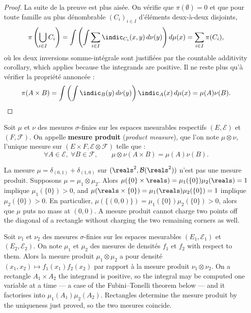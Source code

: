 \begin{proof}
  La suite de la preuve est plus aisée. On vérifie que $\pi(\emptyset) = 0$ et que
  pour toute famille au plus dénombrable $(C_{i})_{i \in I}$ d'éléments deux-à-deux
  disjoints,
  \[
    \pi \left( \bigcup_{i \in I} C_{i} \right)
    = \int \left( \int \sum_{i \in I} \indic_{C_{i}}(x,y) \, d\nu(y) \right) d\mu(x)
    = \sum_{i \in I} \pi(C_{i}) ,
  \]
  où les deux inversions somme-intégrale sont justifiées par the countable
  additivity corollary, which applies because the integrands are positive. Il ne
  reste plus qu'à vérifier la propriété annoncée :
  \[
    \pi(A \times B)
    = \int \left( \int \indic_{B}(y) \, d\nu(y) \right) \indic_{A}(x) \, d\mu(x)
    = \mu(A) \nu(B) . \qedhere
  \]
\end{proof}

\begin{definition}
  Soit $\mu$ et $\nu$ des mesures $\sigma$-finies sur les espaces mesurables
  respectifs $(E,\mathcal{E})$ et $(F,\mathcal{F})$. On appelle \textbf{mesure
  produit} (\textit{product measure}), que l'on note $\mu \otimes \nu$, l'unique
  mesure sur $(E \times F, \mathcal{E} \otimes \mathcal{F})$ telle que :
  \[
    \forall A \in \mathcal{E}, \; \forall B \in \mathcal{F}, \qquad
    \mu \otimes \nu(A \times B) = \mu(A) \nu(B) .
  \]
\end{definition}

\begin{example}
  La mesure $\mu = \delta_{(0,1)} + \delta_{(1,0)}$ sur
  $(\reals^{2},\mathcal{B}(\reals^{2}))$ n'est pas une mesure produit. Supposons
  $\mu = \mu_{1} \otimes \mu_{2}$. Alors $\mu(\{0\} \times \reals) = \mu_{1}(\{0\})
  \mu_{2}(\reals) = 1$ implique $\mu_{1}(\{0\}) > 0$, and $\mu(\reals \times \{0\}) =
  \mu_{1}(\reals) \mu_{2}(\{0\}) = 1$ implique $\mu_{2}(\{0\}) > 0$. En particulier,
  $\mu(\{(0,0)\}) = \mu_{1}(\{0\}) \mu_{2}(\{0\}) > 0$, alors que $\mu$ puts no mass
  at $(0,0)$. A mesure produit cannot charge two points off the diagonal of a
  rectangle without charging the two remaining corners as well.
\end{example}

\begin{example}
  Soit $\nu_{1}$ et $\nu_{2}$ des mesures $\sigma$-finies sur les espaces
  mesurables $(E_{1},\mathcal{E}_{1})$ et $(E_{2},\mathcal{E}_{2})$. On note
  $\mu_{1}$ et $\mu_{2}$ des mesures de densités $f_{1}$ et $f_{2}$ with respect to
  them. Alors la mesure produit $\mu_{1} \otimes \mu_{2}$ a pour densité $(x_{1},x_{2})
  \mapsto f_{1}(x_{1}) f_{2}(x_{2})$ par rapport à la mesure produit $\nu_{1}
  \otimes \nu_{2}$. On a rectangle $A_{1} \times A_{2}$ the integrand is positive, so
  the integral may be computed one variable at a time --- a case of the
  Fubini--Tonelli theorem below --- and it factorises into $\mu_{1}(A_{1})
  \mu_{2}(A_{2})$. Rectangles determine the mesure produit by the uniqueness just
  proved, so the two mesures coincide.
\end{example}

